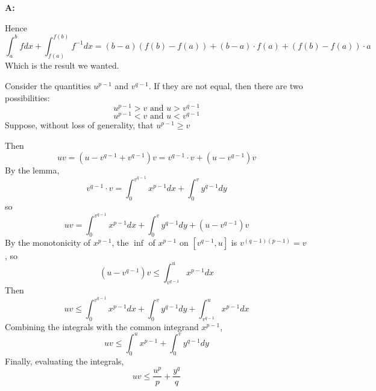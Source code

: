 \documentclass{article}
\newenvironment{Answer} {\par\noindent\textbf{A:}} {}
\begin{document}
\begin{Answer}
\begin{itemize}
    Hence
    \[\int_a^b f dx + \int_{f(a)}^{f(b)} f^{-1} dx = (b-a)(f(b)-f(a)) + (b-a)\cdot f(a) + (f(b) - f(a))\cdot a\]
    Which is the result we wanted.

        Consider the quantities $u^{p-1}$ and $v^{q-1}$. If they are not equal, then there are two possibilities:
        \[u^{p-1} > v \text{ and } u > v^{q-1}\]
        \[u^{p-1} < v \text{ and } u < v^{q-1}\]
    Suppose, without loss of generality, that $u^{p-1} \geq v$

    Then 
    \[ uv = (u - v^{q-1} + v^{q-1}) v = v^{q-1} \cdot v + (u-v^{q-1})v\] 
    By the lemma,
    \[v^{q-1} \cdot v = \int_0^{v^{q-1}} x^{p-1} dx + \int_0^v y^{q-1} dy\]
    so
    \[uv = \int_0^{v^{q-1}} x^{p-1} dx + \int_0^v y^{q-1} dy + (u - v^{q-1}) v\]
    By the monotonicity of $x^{p-1}$, the $\inf$ of $x^{p-1}$ on $[v^{q-1}, u]$ is $v^{(q-1)(p-1)} = v$, so 
    \[(u - v^{q-1})v \leq \int_{v^{q-1}}^u x^{p-1}dx\]
    Then 
    \[uv \leq \int_0^{v^{q-1}} x^{p-1} dx + \int_0^v y^{q-1} dy + \int_{v^{q-1}}^u x^{p-1} dx\] 
    Combining the integrals with the common integrand $x^{p-1}$,
    \[uv \leq \int_0^u x^{p-1} + \int_0^v y^{q-1} dy\]
    Finally, evaluating the integrals,
    \[uv \leq \frac{u^p}{p} + \frac{y^q}{q}\]
    \end{itemize}
\end{Answer}
\end{document}
